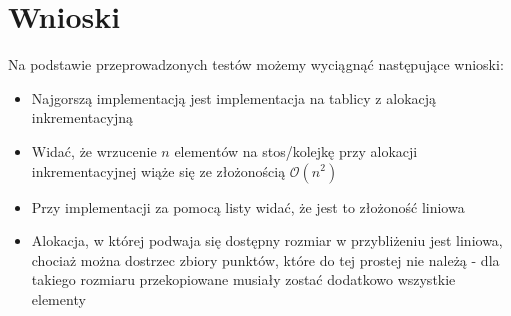 \documentclass[10pt,a4paper]{article}
\begin{document}
\section{Wnioski}
Na podstawie przeprowadzonych testów możemy wyciągnąć następujące wnioski:
\begin{itemize}
	\item Najgorszą implementacją jest implementacja na tablicy z alokacją inkrementacyjną
	\item Widać, że wrzucenie $n$ elementów na stos/kolejkę przy alokacji inkrementacyjnej
	 wiąże się ze złożonością $\mathcal{O}(n^2)$
	\item Przy implementacji za pomocą listy widać, że jest to złożoność liniowa
	\item Alokacja, w której podwaja się dostępny rozmiar w przybliżeniu jest liniowa,
	chociaż można dostrzec zbiory punktów, które do tej prostej nie należą - dla takiego rozmiaru
	przekopiowane musiały zostać dodatkowo wszystkie elementy
\end{itemize}
\end{document}
